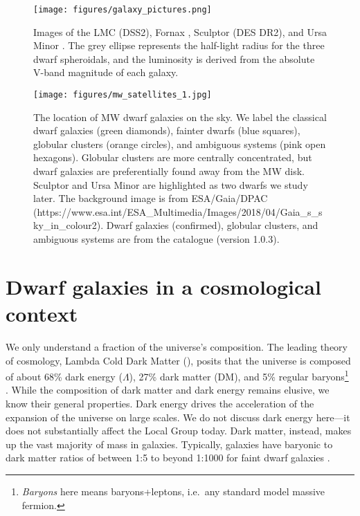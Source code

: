 \begin{figure}
\centering
\texttt{[image: figures/galaxy\_pictures.png]}
\caption[Dwarf Galaxy Pictures]{Images of the LMC (DSS2), Fornax
\citep[DES DR2,][]{abbott+2021}, Sculptor (DES DR2), and Ursa Minor
\citep[UNWISE,][with \textit{Gaia} point sources
over-plotted]{lang2014, meisner+lang+schlegel2017, meisner+lang+schlegel2017a}.
The grey ellipse represents the half-light radius for the three dwarf
spheroidals, and the luminosity is derived from the absolute V-band
magnitude of each galaxy.}\label{fig:galaxy_images}
\end{figure}

\begin{figure}
\centering
\texttt{[image: figures/mw\_satellites\_1.jpg]}
\caption[Dwarf galaxies sky position]{The location of MW dwarf galaxies
on the sky. We label the classical dwarf galaxies (green diamonds),
fainter dwarfs (blue squares), globular clusters (orange circles), and
ambiguous systems (pink open hexagons). Globular clusters are more
centrally concentrated, but dwarf galaxies are preferentially found away
from the MW disk. Sculptor and Ursa Minor are highlighted as two dwarfs
we study later. The background image is from ESA/Gaia/DPAC
(https://www.esa.int/ESA\_Multimedia/Images/2018/04/Gaia\_s\_sky\_in\_colour2).
Dwarf galaxies (confirmed), globular clusters, and ambiguous systems are
from the \citet{pace2024} catalogue (version
1.0.3).}\label{fig:mw_satellite_system}
\end{figure}

\section{Dwarf galaxies in a cosmological
context}\label{dwarf-galaxies-in-a-cosmological-context}

We only understand a fraction of the universe's composition. The leading
theory of cosmology, Lambda Cold Dark Matter (\LCDM{}), posits that the
universe is composed of about 68\% dark energy (\(\Lambda\)), 27\% dark
matter (DM), and 5\% regular baryons\footnote{\emph{Baryons} here means
  baryons+leptons, i.e.~any standard model massive fermion.}
\citep{planckcollaboration+2020}. While the composition of dark matter
and dark energy remains elusive, we know their general properties. Dark
energy drives the acceleration of the expansion of the universe on large
scales. We do not discuss dark energy here---it does not substantially
affect the Local Group today. Dark matter, instead, makes up the vast
majority of mass in galaxies. Typically, galaxies have baryonic to dark
matter ratios of between 1:5 to beyond 1:1000 for faint dwarf galaxies
\citep[e.g.,][]{hayashi+2023}.

